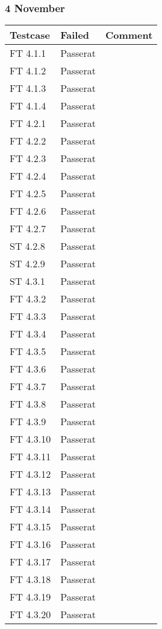 \documentclass[a4paper]{article}
\begin{document}
\subsubsection{4 November}
\begin{tabular}{| l | l | p{11cm} |}
\hline
Testcase &  Failed & Comment\\
\hline
FT 4.1.1 & Passerat & \\
\hline
FT 4.1.2 & Passerat & \\
\hline
FT 4.1.3 & Passerat & \\
\hline
FT 4.1.4 & Passerat & \\
\hline
FT 4.2.1 & Passerat & \\
\hline
FT 4.2.2 & Passerat & \\
\hline
FT 4.2.3 & Passerat & \\
\hline
FT 4.2.4 & Passerat & \\
\hline
FT 4.2.5 & Passerat & \\
\hline
FT 4.2.6 & Passerat & \\
\hline
FT 4.2.7 & Passerat & \\
\hline
ST 4.2.8 & Passerat & \\
\hline
ST 4.2.9 & Passerat & \\
\hline
ST 4.3.1 & Passerat & \\
\hline
FT 4.3.2 & Passerat & \\
\hline
FT 4.3.3 & Passerat &  \\
\hline
FT 4.3.4 & Passerat & \\
\hline
FT 4.3.5 & Passerat & \\
\hline
FT 4.3.6 & Passerat & \\
\hline
FT 4.3.7 & Passerat & \\
\hline
FT 4.3.8 & Passerat & \\
\hline
FT 4.3.9 & Passerat & \\
\hline
FT 4.3.10 & Passerat & \\
\hline
FT 4.3.11 & Passerat & \\
\hline
FT 4.3.12 & Passerat & \\
\hline
FT 4.3.13 & Passerat & \\
\hline
FT 4.3.14 & Passerat & \\
\hline
FT 4.3.15 & Passerat & \\
\hline
FT 4.3.16 & Passerat & \\
\hline
FT 4.3.17 & Passerat & \\
\hline
FT 4.3.18 & Passerat & \\
\hline
FT 4.3.19 & Passerat & \\
\hline
FT 4.3.20 & Passerat & \\
\hline
\end{tabular}
\end{document}
